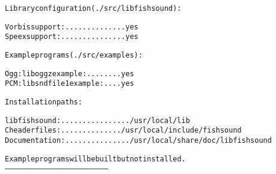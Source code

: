 \small\begin{alltt}  Library configuration (./src/libfishsound):\end{alltt}\normalsize 


\small\begin{alltt}    Vorbis support: .............. yes
    Speex support: ............... yes\end{alltt}\normalsize 


\small\begin{alltt}  Example programs (./src/examples):\end{alltt}\normalsize 


\small\begin{alltt}    Ogg: liboggz example: ........ yes
    PCM: libsndfile1 example: .... yes\end{alltt}\normalsize 


\small\begin{alltt}  Installation paths:\end{alltt}\normalsize 


\small\begin{alltt}    libfishsound: ................ /usr/local/lib
    C header files: .............. /usr/local/include/fishsound
    Documentation: ............... /usr/local/share/doc/libfishsound\end{alltt}\normalsize 


\small\begin{alltt}  Example programs will be built but not installed.
------------------------------------------------------------------------
\end{alltt}\normalsize 
 

